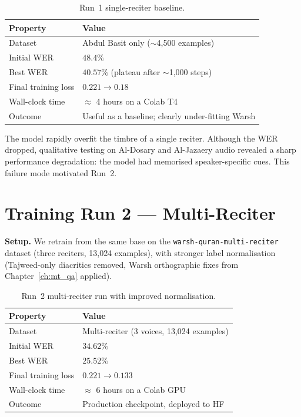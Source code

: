 \documentclass[12pt,a4paper]{report}
\begin{document}
\begin{table}[H]
  \centering
  \caption{Run~1 single-reciter baseline.}
  \label{tab:mt_run1}
  \renewcommand{\arraystretch}{1.3}
  \begin{tabular}{ll}
    \toprule
    \textbf{Property} & \textbf{Value} \\
    \midrule
    Dataset                     & Abdul Basit only ($\sim$4{,}500 examples) \\
    Initial WER                 & $48.4\%$ \\
    Best WER                    & $40.57\%$ (plateau after $\sim$1{,}000 steps) \\
    Final training loss         & $0.221 \rightarrow 0.18$ \\
    Wall-clock time             & $\approx$ 4 hours on a Colab T4 \\
    Outcome                     & Useful as a baseline; clearly under-fitting Warsh \\
    \bottomrule
  \end{tabular}
\end{table}

The model rapidly overfit the timbre of a single reciter. Although the
WER dropped, qualitative testing on Al-Dosary and Al-Jazaery audio
revealed a sharp performance degradation: the model had memorised
speaker-specific cues. This failure mode motivated Run~2.

\section{Training Run 2 --- Multi-Reciter}
\label{sec:mt_run2}

\textbf{Setup.} We retrain from the same base on the
\texttt{warsh-quran-multi-reciter} dataset (three reciters,
13{,}024 examples), with stronger label normalisation (Tajweed-only
diacritics removed, Warsh orthographic fixes from
Chapter~\ref{ch:mt_qa} applied).

\begin{table}[H]
  \centering
  \caption{Run~2 multi-reciter run with improved normalisation.}
  \label{tab:mt_run2}
  \renewcommand{\arraystretch}{1.3}
  \begin{tabular}{ll}
    \toprule
    \textbf{Property} & \textbf{Value} \\
    \midrule
    Dataset                     & Multi-reciter (3 voices, 13{,}024 examples) \\
    Initial WER                 & $34.62\%$ \\
    Best WER                    & $\mathbf{25.52\%}$ \\
    Final training loss         & $0.221 \rightarrow 0.133$ \\
    Wall-clock time             & $\approx$ 6 hours on a Colab GPU \\
    Outcome                     & Production checkpoint, deployed to HF \\
    \bottomrule
  \end{tabular}
\end{table}
\end{document}
